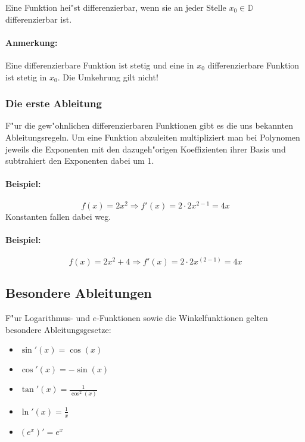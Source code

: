 \begin{definition}[Differenzierbarkeit]
Eine Funktion hei"st differenzierbar, wenn sie an jeder Stelle $x_0 \in \mathbb{D}$ differenzierbar ist.
\end{definition}

\paragraph{Anmerkung:} Eine differenzierbare Funktion ist stetig und eine in $x_0$ differenzierbare Funktion ist stetig in $x_0$. Die Umkehrung gilt nicht!

\subsubsection{Die erste Ableitung}
F"ur die gew"ohnlichen differenzierbaren Funktionen gibt es die uns bekannten Ableitungsregeln. Um eine Funktion abzuleiten multipliziert man bei Polynomen jeweils die Exponenten mit den dazugeh"origen Koeffizienten ihrer Basis und subtrahiert den Exponenten dabei um 1.

\paragraph{Beispiel:}
\begin{equation*}
f(x)=2x^2 \Rightarrow f'(x)= 2 \cdot 2x^{2-1}=4x
\end{equation*}
Konstanten fallen dabei weg.

\paragraph{Beispiel:}
\begin{equation*}
f(x)=2x^2+4 \Rightarrow f'(x)= 2 \cdot 2x^(2-1)=4x
\end{equation*}

\subsection{Besondere Ableitungen}
F"ur Logarithmus- und $e$-Funktionen sowie die Winkelfunktionen gelten besondere Ableitungsgesetze:
\begin{itemize}
\item $\sin'(x) = \cos(x)$
\item $\cos'(x) = - \sin(x)$
\item $\tan'(x) = \frac{1}{\cos^2(x)}$
\item $\ln'(x) = \frac{1}{x}$
\item $(e^x)' = e^x$
\end{itemize}

